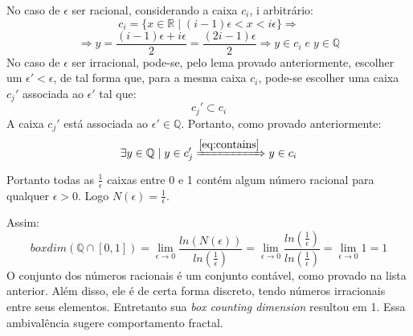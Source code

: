 \documentclass{article}[twocolumn]
\begin{document}
	No caso de $\epsilon$ ser racional, considerando a caixa $c_{i}$, i arbitr\'ario:
	\begin{equation}
		c_{i} = \{x \in \mathbb{R} \; | \; (i - 1)\epsilon < x < i\epsilon\} \Rightarrow
		\nonumber
	\end{equation}
	\begin{equation}
		\Rightarrow y = \frac{(i - 1)\epsilon + i\epsilon}{2} = \frac{(2i - 1)\epsilon}{2}
		\Rightarrow y \in c_{i} \; e \; y \in \mathbb{Q}
		\nonumber
	\end{equation}
	No caso de $\epsilon$ ser irracional, pode-se, pelo lema provado anteriormente,
	escolher um $\epsilon' < \epsilon$, de tal forma que, para a mesma caixa $c_{i}$,
	pode-se escolher uma caixa $c_{j}'$ associada ao $\epsilon'$ tal que:
	\begin{equation}
		c_{j}' \subset c_{i}
		\label{eq:contains}
	\end{equation}
	A caixa $c_{j}'$ est\'a associada ao $\epsilon' \in \mathbb{Q}$. Portanto, como
	provado anteriormente:
	\begin{equation}
		\exists y \in \mathbb{Q} \; | \; y \in c_{j}' \xRightarrow{\ref{eq:contains}}
		y \in c_{i}
		\nonumber
	\end{equation}
	Portanto todas as $\frac{1}{\epsilon}$ caixas entre 0 e 1 cont\'em algum n\'umero
	racional para qualquer $\epsilon > 0$. Logo $N(\epsilon) = \frac{1}{\epsilon}$.
	
	Assim:
	\begin{equation}
		boxdim(\mathbb{Q}\cap[0, 1]) =
		\lim_{\epsilon \rightarrow 0}\frac{ln(N(\epsilon))}{ln(\frac{1}{\epsilon})} =
		\lim_{\epsilon \rightarrow 0}\frac{ln(\frac{1}{\epsilon})}{ln(\frac{1}{\epsilon})} =
		\lim_{\epsilon \rightarrow 0}1 = 1
		\nonumber
	\end{equation}
	O conjunto dos n\'umeros racionais \'e um conjunto cont\'avel, como provado na lista
	anterior. Al\'em disso, ele \'e de certa forma discreto, tendo n\'umeros irracionais
	entre seus elementos. Entretanto sua \textit{box counting dimension} resultou em 1.
	Essa ambival\^encia sugere comportamento fractal.
\end{document}
